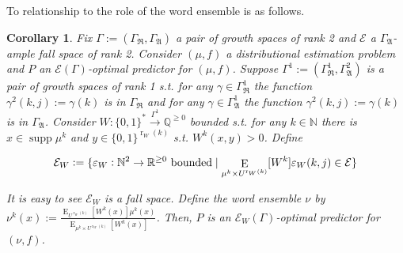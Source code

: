 \documentclass{article}
\theoremstyle{definition}
\theoremstyle{plain}
\newtheorem{corollary}{Corollary}[section]
\newcommand{\Words}{{\{ 0, 1 \}^*}}
\newcommand{\WordsLen}[1]{{\{ 0, 1 \}^{#1}}}
\DeclareMathOperator{\Supp}{supp}
\DeclareMathOperator{\E}{E}
\DeclareMathOperator{\R}{r}
\newcommand{\Nats}{\mathbb{N}}
\newcommand{\Rats}{\mathbb{Q}}
\newcommand{\Reals}{\mathbb{R}}
\begin{document}
To relationship to the role of the word ensemble is as follows.

\begin{samepage}
\begin{corollary}

Fix $\Gamma:=(\Gamma_{\mathfrak{R}},\Gamma_{\mathfrak{A}})$ a pair of growth spaces of rank 2 and $\mathcal{E}$ a $\Gamma_{\mathfrak{A}}$-ample fall space of rank 2. Consider $(\mu,f)$ a distributional estimation problem and $P$ an $\mathcal{E}(\Gamma)$-optimal predictor for $(\mu,f)$. Suppose $\Gamma^1:=(\Gamma_{\mathfrak{R}}^1,\Gamma_{\mathfrak{A}}^2)$ is a pair of growth spaces of rank 1 s.t. for any $\gamma \in \Gamma_{\mathfrak{R}}^1$ the function ${\gamma^2(k,j):=\gamma(k)}$ is in $\Gamma_{\mathfrak{R}}$ and for any $\gamma \in \Gamma_{\mathfrak{A}}^1$ the function $\gamma^2(k,j):=\gamma(k)$ is in $\Gamma_{\mathfrak{A}}$. Consider ${W: \Words \xrightarrow{\Gamma^1} \Rats^{\geq 0}}$ bounded s.t. for any $k \in \Nats$ there is $x \in \Supp \mu^k$ and $y \in \WordsLen{\R_W(k)}$ s.t. $W^k(x,y) > 0$. Define 

$${\mathcal{E}_W:=\{\varepsilon_W: \Nats^2 \rightarrow \Reals^{\geq 0} \textnormal{ bounded} \mid  \E_{\mu^k \times U^{\R_W(k)}}[W^k]\varepsilon_W(k,j) \in \mathcal{E}\}}$$

It is easy to see $\mathcal{E}_W$ is a fall space. Define the word ensemble $\nu$ by ${\nu^k(x):=\frac{\E_{U^{\R_W(k)}}[W^k(x)] \mu^k(x)}{\E_{\mu^k \times U^{\R_W(k)}}[W^k(x)]}}$. Then, $P$ is an $\mathcal{E}_W(\Gamma)$-optimal predictor for $(\nu,f)$.

\end{corollary}
\end{samepage}
\end{document}
